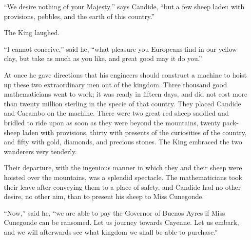 ``We desire nothing of your Majesty,'' says Candide, ``but a few sheep laden with provisions, pebbles, and the earth of this country.''

The King laughed.

``I cannot conceive,'' said he, ``what pleasure you Europeans find in our yellow clay, but take as much as you like, and great good may it do you.''

At once he gave directions that his engineers should construct a machine to hoist up these two extraordinary men out of the kingdom. Three thousand good mathematicians went to work; it was ready in fifteen days, and did not cost more than twenty million sterling in the specie of that country. They placed Candide and Cacambo on the machine. There were two great red sheep saddled and bridled to ride upon as soon as they were beyond the mountains, twenty pack-sheep laden with provisions, thirty with presents of the curiosities of the country, and fifty with gold, diamonds, and precious stones. The King embraced the two wanderers very tenderly.

Their departure, with the ingenious manner in which they and their sheep were hoisted over the mountains, was a splendid spectacle. The mathematicians took their leave after conveying them to a place of safety, and Candide had no other desire, no other aim, than to present his sheep to Miss Cunegonde.

``Now,'' said he, ``we are able to pay the Governor of Buenos Ayres if Miss Cunegonde can be ransomed. Let us journey towards Cayenne. Let us embark, and we will afterwards see what kingdom we shall be able to purchase.''

